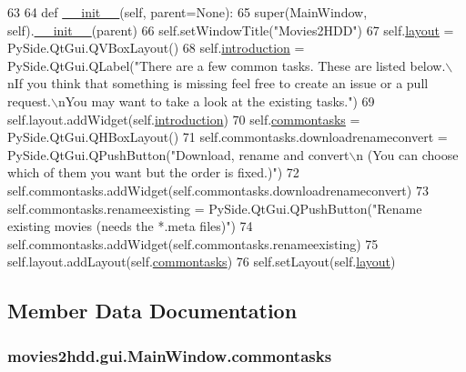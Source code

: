 \begin{DoxyCode}
63 
64     \textcolor{keyword}{def }\hyperlink{classmovies2hdd_1_1gui_1_1_main_window_a2a26220b2cdbc5868ce39bbe5225d43e}{\_\_init\_\_}(self, parent=None):
65         super(MainWindow, self).\hyperlink{classmovies2hdd_1_1gui_1_1_main_window_a2a26220b2cdbc5868ce39bbe5225d43e}{\_\_init\_\_}(parent)
66         self.setWindowTitle(\textcolor{stringliteral}{"Movies2HDD"})
67         self.\hyperlink{classmovies2hdd_1_1gui_1_1_main_window_a33aed6a40173ad6916d4c0682d204b3a}{layout} = PySide.QtGui.QVBoxLayout()
68         self.\hyperlink{classmovies2hdd_1_1gui_1_1_main_window_a26535b6fc26552cfc8ca56beb4d4cce7}{introduction} = PySide.QtGui.QLabel(\textcolor{stringliteral}{"There are a few common tasks. These are listed
       below.\(\backslash\)nIf you think that something is missing feel free to create an issue or a pull request.\(\backslash\)nYou may
       want to take a look at the existing tasks."})
69         self.layout.addWidget(self.\hyperlink{classmovies2hdd_1_1gui_1_1_main_window_a26535b6fc26552cfc8ca56beb4d4cce7}{introduction})
70         self.\hyperlink{classmovies2hdd_1_1gui_1_1_main_window_ae67a5547b931e5c38cfa7c0c24c9dbd8}{commontasks} = PySide.QtGui.QHBoxLayout()
71         self.commontasks.downloadrenameconvert = PySide.QtGui.QPushButton(\textcolor{stringliteral}{"Download, rename and convert\(\backslash\)n
      (You can choose which of them you want but the order is fixed.)"})
72         self.commontasks.addWidget(self.commontasks.downloadrenameconvert)
73         self.commontasks.renameexisting = PySide.QtGui.QPushButton(\textcolor{stringliteral}{"Rename existing movies (needs the
       *.meta files)"})
74         self.commontasks.addWidget(self.commontasks.renameexisting)
75         self.layout.addLayout(self.\hyperlink{classmovies2hdd_1_1gui_1_1_main_window_ae67a5547b931e5c38cfa7c0c24c9dbd8}{commontasks})
76         self.setLayout(self.\hyperlink{classmovies2hdd_1_1gui_1_1_main_window_a33aed6a40173ad6916d4c0682d204b3a}{layout})

\end{DoxyCode}


\subsection{Member Data Documentation}
\hypertarget{classmovies2hdd_1_1gui_1_1_main_window_ae67a5547b931e5c38cfa7c0c24c9dbd8}{
\subsubsection[{commontasks}]{\setlength{\rightskip}{0pt plus 5cm}movies2hdd.\-gui.\-Main\-Window.\-commontasks}}\label{classmovies2hdd_1_1gui_1_1_main_window_ae67a5547b931e5c38cfa7c0c24c9dbd8}


